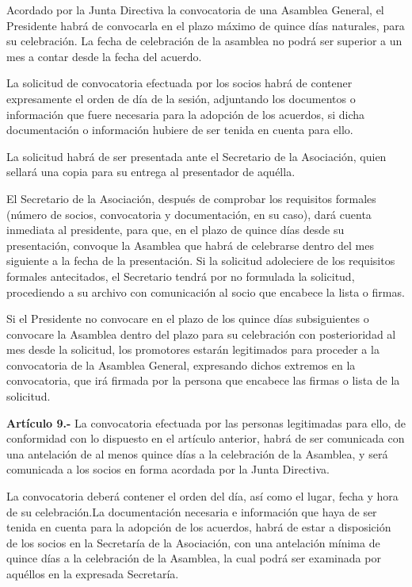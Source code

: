 \documentclass[a4paper,12pt]{article}
\begin{document}
\begin{onehalfspace}
Acordado por la Junta Directiva la convocatoria de una Asamblea General, el Presidente habrá de convocarla en el plazo máximo de quince días naturales, para su celebración. La fecha de celebración de la asamblea no podrá ser superior a un mes a contar desde la fecha del acuerdo.

La solicitud de convocatoria efectuada por los socios habrá de contener expresamente el orden de día de la sesión, adjuntando los documentos o información que fuere necesaria para la adopción de los acuerdos, si dicha documentación o información hubiere de ser tenida en cuenta para ello.

La solicitud habrá de ser presentada ante el Secretario de la Asociación, quien sellará una copia para su entrega al presentador de aquélla.

El Secretario de la Asociación, después de comprobar los requisitos formales (número de socios, convocatoria y documentación, en su caso), dará cuenta inmediata al presidente, para que, en el plazo de quince días desde su presentación, convoque la Asamblea que habrá de celebrarse dentro del mes siguiente a la fecha de la presentación. Si la solicitud adoleciere de los requisitos formales antecitados, el Secretario tendrá por no formulada la solicitud, procediendo a su archivo con comunicación al socio que encabece la lista o firmas.

Si el Presidente no convocare en el plazo de los quince días subsiguientes o convocare la Asamblea dentro del plazo para su celebración con posterioridad al mes desde la solicitud, los promotores estarán legitimados para proceder a la convocatoria de la Asamblea General, expresando dichos extremos en la convocatoria, que irá firmada por la persona que encabece las firmas o lista de la solicitud.

\bigskip\bigskip

\textbf{Artículo 9.-} La convocatoria efectuada por las personas legitimadas para ello, de conformidad con lo dispuesto en el artículo anterior, habrá de ser comunicada con una antelación de al menos quince días a la celebración de la Asamblea, y será comunicada a los socios en forma acordada por la Junta Directiva.

La convocatoria deberá contener el orden del día, así como el lugar, fecha y hora de su celebración.La documentación necesaria e información que haya de ser tenida en cuenta para la adopción de los acuerdos, habrá de estar a disposición de los socios en la Secretaría de la Asociación, con una antelación mínima de quince días a la celebración de la Asamblea, la cual podrá ser examinada por aquéllos en la expresada Secretaría.


\end{onehalfspace}
\end{document}
